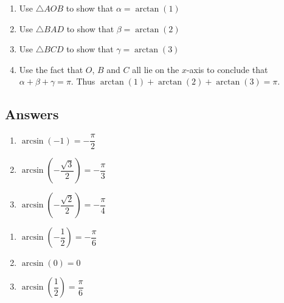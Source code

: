 \begin{enumerate}
\begin{enumerate}
\item Use $\triangle AOB$ to show that $\alpha = \arctan(1)$
\item Use $\triangle BAD$ to show that $\beta = \arctan(2)$
\item Use $\triangle BCD$ to show that $\gamma = \arctan(3)$

\item Use the fact that $O$, $B$ and $C$ all lie on the $x$-axis to conclude that $\alpha + \beta + \gamma = \pi$.  Thus $\arctan(1) + \arctan(2) + \arctan(3) = \pi$.

\end{enumerate}

\end{enumerate}

\newpage

\subsection{Answers}

 \begin{multicols}{3} 

\begin{enumerate}

\item $\arcsin \left( -1 \right) = -\dfrac{\pi}{2}$ 
\item $\arcsin \left( -\dfrac{\sqrt{3}}{2} \right) = -\dfrac{\pi}{3}$
\item $\arcsin \left( -\dfrac{\sqrt{2}}{2} \right) = -\dfrac{\pi}{4}$

\setcounter{HW}{\value{enumi}}

\end{enumerate}

\end{multicols}

\begin{multicols}{3} 

\begin{enumerate}

\setcounter{enumi}{\value{HW}}

\item $\arcsin \left( -\dfrac{1}{2} \right) = -\dfrac{\pi}{6}$
\item $\arcsin \left( 0 \right) = 0$ 
\item $\arcsin \left( \dfrac{1}{2} \right) = \dfrac{\pi}{6}$

\setcounter{HW}{\value{enumi}}

\end{enumerate}

\end{multicols}

